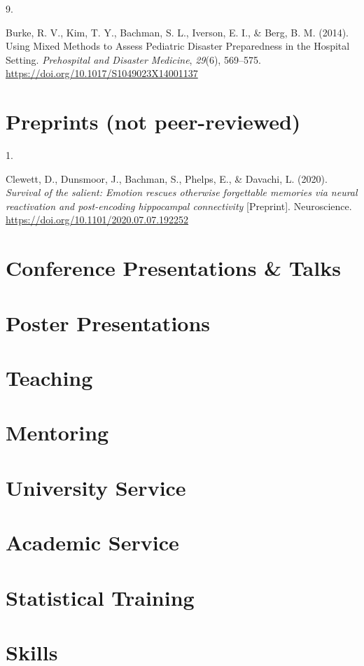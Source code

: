 \documentclass[11pt, a4paper]{awesome-cv}
\newlength{\csllabelwidth}
\newcommand{\CSLLeftMargin}[1]{\parbox[t]{\csllabelwidth}{#1}}
\newcommand{\CSLRightInline}[1]{\parbox[t]{\linewidth - \csllabelwidth}{#1}}
\begin{document}
\leavevmode\hypertarget{ref-burke_using_2014}{}%
\CSLLeftMargin{9. }
\CSLRightInline{Burke, R. V., Kim, T. Y., Bachman, S. L., Iverson, E.
I., \& Berg, B. M. (2014). Using Mixed Methods to Assess Pediatric
Disaster Preparedness in the Hospital Setting. \emph{Prehospital and
Disaster Medicine}, \emph{29}(6), 569--575.
\url{https://doi.org/10.1017/S1049023X14001137}}

\hypertarget{preprints-not-peer-reviewed}{%
\section{Preprints (not
peer-reviewed)}\label{preprints-not-peer-reviewed}}

\hypertarget{bibliography}{}
\leavevmode\hypertarget{ref-clewett_survival_2020}{}%
\CSLLeftMargin{1. }
\CSLRightInline{Clewett, D., Dunsmoor, J., Bachman, S., Phelps, E., \&
Davachi, L. (2020). \emph{Survival of the salient: Emotion rescues
otherwise forgettable memories via neural reactivation and post-encoding
hippocampal connectivity} {[}Preprint{]}. Neuroscience.
\url{https://doi.org/10.1101/2020.07.07.192252}}

\hypertarget{conference-presentations-talks}{%
\section{Conference Presentations \&
Talks}\label{conference-presentations-talks}}

\hypertarget{poster-presentations}{%
\section{Poster Presentations}\label{poster-presentations}}

\hypertarget{teaching}{%
\section{Teaching}\label{teaching}}

\hypertarget{mentoring}{%
\section{Mentoring}\label{mentoring}}

\hypertarget{university-service}{%
\section{University Service}\label{university-service}}

\hypertarget{academic-service}{%
\section{Academic Service}\label{academic-service}}

\hypertarget{statistical-training}{%
\section{Statistical Training}\label{statistical-training}}

\hypertarget{skills}{%
\section{Skills}\label{skills}}
\end{document}
